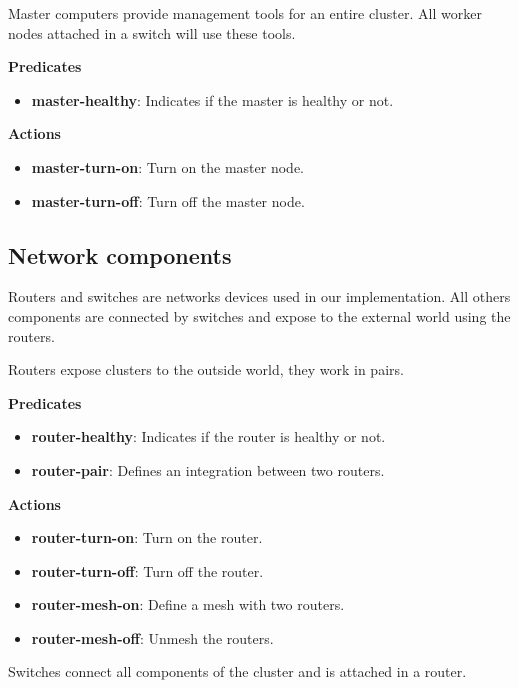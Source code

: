 \documentclass[letterpaper]{article}
\begin{document}
Master computers provide management tools for an entire cluster. All worker nodes attached in a switch will use these tools. 

\textbf{Predicates}

\begin{itemize}
    \item \textbf{master-healthy}: Indicates if the master is healthy or not.
\end{itemize}

\textbf{Actions}

\begin{itemize}
    \item \textbf{master-turn-on}: Turn on the master node.
    \item \textbf{master-turn-off}: Turn off the master node.
\end{itemize}

\subsection{Network components}\label{sec:implementation2}

Routers and switches are networks devices used in our implementation. All others components are connected by switches and expose to the external world using the routers.

Routers expose clusters to the outside world, they work in pairs.

\textbf{Predicates}

\begin{itemize}
    \item \textbf{router-healthy}: Indicates if the router is healthy or not.
    \item \textbf{router-pair}: Defines an integration between two routers.
\end{itemize}

\textbf{Actions}

\begin{itemize}
    \item \textbf{router-turn-on}: Turn on the router.
    \item \textbf{router-turn-off}: Turn off the router.
    \item \textbf{router-mesh-on}: Define a mesh with two routers.
    \item \textbf{router-mesh-off}: Unmesh the routers.
\end{itemize}

Switches connect all components of the cluster and is attached in a router.
\end{document}
